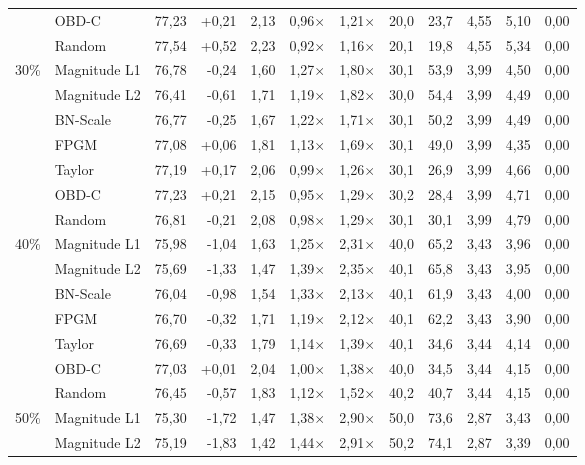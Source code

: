 \begin{table}[H]
{{\begin{tabular}{c l rr rrr rr rrr}
     & OBD-C & 77,23 & +0,21 & 2,13 & 0,96$\times$ & 1,21$\times$ & 20,0 & 23,7 & 4,55 & 5,10 & 0,00 \\
     & Random & 77,54 & +0,52 & 2,23 & 0,92$\times$ & 1,16$\times$ & 20,1 & 19,8 & 4,55 & 5,34 & 0,00 \\
    \midrule
    \multirow{7}{*}{30\%} & Magnitude L1 & 76,78 & -0,24 & 1,60 & 1,27$\times$ & 1,80$\times$ & 30,1 & 53,9 & 3,99 & 4,50 & 0,00 \\
     & Magnitude L2 & 76,41 & -0,61 & 1,71 & 1,19$\times$ & 1,82$\times$ & 30,0 & 54,4 & 3,99 & 4,49 & 0,00 \\
     & BN-Scale & 76,77 & -0,25 & 1,67 & 1,22$\times$ & 1,71$\times$ & 30,1 & 50,2 & 3,99 & 4,49 & 0,00 \\
     & FPGM & 77,08 & +0,06 & 1,81 & 1,13$\times$ & 1,69$\times$ & 30,1 & 49,0 & 3,99 & 4,35 & 0,00 \\
     & Taylor & 77,19 & +0,17 & 2,06 & 0,99$\times$ & 1,26$\times$ & 30,1 & 26,9 & 3,99 & 4,66 & 0,00 \\
     & OBD-C & 77,23 & +0,21 & 2,15 & 0,95$\times$ & 1,29$\times$ & 30,2 & 28,4 & 3,99 & 4,71 & 0,00 \\
     & Random & 76,81 & -0,21 & 2,08 & 0,98$\times$ & 1,29$\times$ & 30,1 & 30,1 & 3,99 & 4,79 & 0,00 \\
    \midrule
    \multirow{7}{*}{40\%} & Magnitude L1 & 75,98 & -1,04 & 1,63 & 1,25$\times$ & 2,31$\times$ & 40,0 & 65,2 & 3,43 & 3,96 & 0,00 \\
     & Magnitude L2 & 75,69 & -1,33 & 1,47 & 1,39$\times$ & 2,35$\times$ & 40,1 & 65,8 & 3,43 & 3,95 & 0,00 \\
     & BN-Scale & 76,04 & -0,98 & 1,54 & 1,33$\times$ & 2,13$\times$ & 40,1 & 61,9 & 3,43 & 4,00 & 0,00 \\
     & FPGM & 76,70 & -0,32 & 1,71 & 1,19$\times$ & 2,12$\times$ & 40,1 & 62,2 & 3,43 & 3,90 & 0,00 \\
     & Taylor & 76,69 & -0,33 & 1,79 & 1,14$\times$ & 1,39$\times$ & 40,1 & 34,6 & 3,44 & 4,14 & 0,00 \\
     & OBD-C & 77,03 & +0,01 & 2,04 & 1,00$\times$ & 1,38$\times$ & 40,0 & 34,5 & 3,44 & 4,15 & 0,00 \\
     & Random & 76,45 & -0,57 & 1,83 & 1,12$\times$ & 1,52$\times$ & 40,2 & 40,7 & 3,44 & 4,15 & 0,00 \\
    \midrule
    \multirow{7}{*}{50\%} & Magnitude L1 & 75,30 & -1,72 & 1,47 & 1,38$\times$ & 2,90$\times$ & 50,0 & 73,6 & 2,87 & 3,43 & 0,00 \\
     & Magnitude L2 & 75,19 & -1,83 & 1,42 & 1,44$\times$ & 2,91$\times$ & 50,2 & 74,1 & 2,87 & 3,39 & 0,00 \\

\end{tabular}}}
\end{table}
